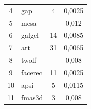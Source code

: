 \begin{table}
\begin{center}
\begin{tabular}{|c|l|c|c|}
4&gap&\hphantom{9}4&0,0025\\


5&mesa&&0,012\hphantom{9}\\


6&galgel&14&0,0085\\


7&art&31&0,0065\\


8&twolf&&0,008\hphantom{9}\\


9&facerec&11&0,0025\\


10\hphantom{9}&apsi&\hphantom{9}5&0,0115\\


11\hphantom{9}&fmas3d&\hphantom{9}3&0,008\hphantom{9}\\


\hline


\end{tabular}


\end{center}


\vspace*{-9pt}


\end{table}





